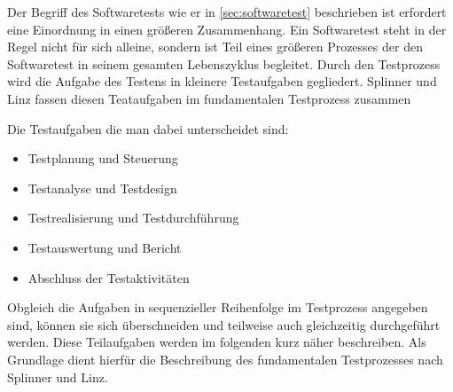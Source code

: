 Der Begriff des Softwaretests wie er in \ref{sec:softwaretest} beschrieben ist erfordert eine Einordnung in einen größeren Zusammenhang. Ein Softwaretest steht in der Regel nicht für sich alleine, sondern ist Teil eines größeren Prozesses der den Softwaretest in seinem gesamten Lebenszyklus begleitet.
Durch den Testprozess wird die Aufgabe des Testens in kleinere Testaufgaben gegliedert.
Splinner und Linz fassen diesen Teataufgaben im fundamentalen Testprozess zusammen \cite{spillner_basiswissen_2007}


Die Testaufgaben die man dabei unterscheidet sind:

\begin{itemize}
	  \itemsep0pt
      \item Testplanung und Steuerung
      \item Testanalyse und Testdesign
      \item Testrealisierung und Testdurchführung
      \item Testauswertung und Bericht
      \item Abschluss der Testaktivitäten       
\end{itemize}

Obgleich die Aufgaben in sequenzieller Reihenfolge im Testprozess angegeben sind, können sie sich überschneiden und teilweise auch gleichzeitig durchgeführt werden. Diese Teilaufgaben werden im folgenden kurz näher beschreiben. Als Grundlage dient hierfür die Beschreibung des fundamentalen Testprozesses nach Splinner und Linz. \cite[S.20ff]{spillner_basiswissen_2007}

